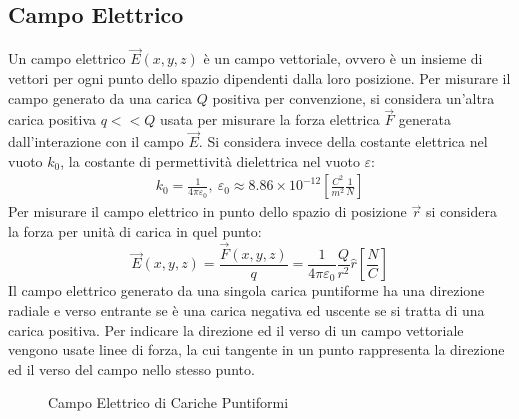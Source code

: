 \documentclass{article}
\numberwithin{equation}{subsection}
\begin{document}
\subsection{Campo Elettrico}
Un campo elettrico $\vec{E}(x,y,z)$ è un campo vettoriale, ovvero è un insieme di vettori per ogni punto dello spazio dipendenti dalla loro posizione. Per misurare il campo 
generato da una carica $Q$ positiva per convenzione, si considera un'altra carica positiva $q<<Q$ usata per misurare la forza elettrica $\vec{F}$ generata dall'interazione con 
il campo $\vec{E}$. Si considera invece della costante elettrica nel vuoto $k_0$, la costante di permettività dielettrica nel vuoto $\varepsilon$:
\begin{gather}
    k_0=\displaystyle\frac{1}{4\pi\varepsilon_0},\:
    \varepsilon_0\approx8.86\times10^{-12}\left[\displaystyle\frac{C^2}{m^2}\frac{1}{N}\right]
\end{gather} 
Per misurare il campo elettrico in punto dello spazio di posizione $\vec{r}$ si considera la forza per unità di carica in quel punto:
\begin{equation}
    \vec{E}(x,y,z)=\displaystyle\frac{\vec{F}(x,y,z)}{q}=\frac{1}{4\pi\varepsilon_0}\frac{Q}{r^2}\hat{r}\left[\frac{N}{C}\right]
\end{equation}
Il campo elettrico generato da una singola carica puntiforme ha una direzione radiale e verso entrante se è una carica negativa ed uscente se si tratta di una carica positiva. 
Per indicare la direzione ed il verso di un campo vettoriale vengono usate linee di forza, la cui tangente in un punto rappresenta la direzione ed il verso del campo nello 
stesso punto. 
\begin{figure}[H]%
    \centering
    \qquad
    \caption{Campo Elettrico di Cariche Puntiformi}
    \label{fig:campo-elettrico-cariche}
\end{figure}
\end{document}
